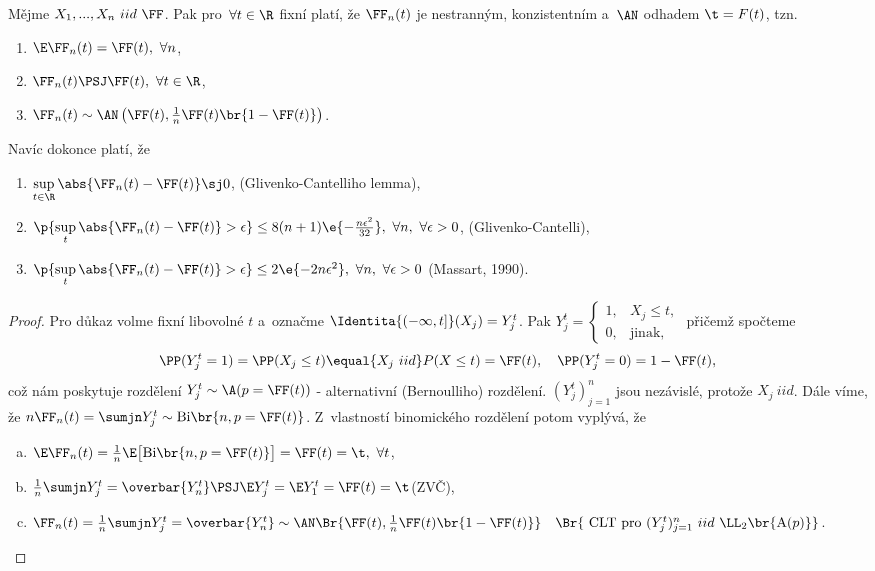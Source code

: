 \begin{theorem}[ZVMS]
	Mějme $X_1,...,X_n~iid~\FF$. Pak pro~$\forall t\in\R$ fixní platí, že $\FF_n(t)$ je nestranným, konzistentním a~$\AN$ odhadem $\t=F(t)$, tzn.\begin{enumerate}
		\item $\E \FF_n(t)=\FF(t),~\forall n$,
		\item $\FF_n(t)\PSJ \FF(t),~\forall t\in\R$,
		\item $\FF_n(t)\sim\AN\left( \FF(t),\frac{1}{n}\FF(t)\br{1-\FF(t)} \right)$. 
\end{enumerate}	
	Navíc dokonce platí, že\begin{enumerate}
		\item $\sup\limits_{t\in\R}\abs{\FF_n(t)-\FF(t)}\sj 0$, (Glivenko-Cantelliho lemma),
		\item $\p{\sup\limits_{t}\abs{\FF_n(t)-\FF(t)}>\epsilon}\leq 8(n+1)\e{-\frac{n\epsilon^2}{32}},~\forall n,~\forall\epsilon>0$, (Glivenko-Cantelli),
		\item $\p{\sup\limits_{t}\abs{\FF_n(t)-\FF(t)}>\epsilon}\leq 2\e{-2n\epsilon^2},~\forall n,~\forall\epsilon>0$ (Massart, 1990).
	\end{enumerate}
	\begin{proof}
	Pro důkaz volme fixní libovolné $t$ a~označme $\Identita{(-\infty,t]}(X_j)=Y_j^t$. Pak
			 $Y_j^t=\begin{cases}
			1, & X_j\leq t, \\ 0, & \text{jinak,}
			\end{cases}$ přičemž spočteme
		$$ \PP(Y_j^t=1)=\PP(X_j\leq t)\equal{X_j~iid}P(X\leq t)=\FF(t),\quad\PP(Y_j^t=0)=1-\FF(t), $$ což nám poskytuje rozdělení $ Y_j^t\sim\A(p=\FF(t))$ - alternativní (Bernoulliho) rozdělení. $(Y_j^t)_{j=1}^n$ jsou nezávislé, protože $X_j~iid$.
		 Dále víme, že $n\FF_n(t)=\sumjn Y_j^t\sim \mathrm{Bi}\br{n,p=\FF(t)}$. Z~vlastností binomického rozdělení potom vyplývá, že 
			\begin{enumerate}[a)]
				\item $\E \FF_n(t)=\frac{1}{n}\E\big[ \mathrm{Bi}\br{n,p=\FF(t)} \big]=\FF(t)=\t,~\forall t$,
				\item $\frac{1}{n}\sumjn Y_j^t =\overbar{Y_n^t}\PSJ  \E Y_j^t=\E Y_1^t=\FF(t)=\t$\quad (ZVČ),
				\item $\FF_n(t)=\frac{1}{n}\sumjn Y_j^t =\overbar{Y_n^t}\sim\AN\Br{\FF(t),\frac{1}{n}\FF(t)\br{1-\FF(t)}}\quad\Br{\text{ CLT pro~}(Y_j^t)_{j=1}^n~iid~\LL_2\br{\mathrm{A}(p)}}$.
			\end{enumerate}
	\end{proof}
\end{theorem}

